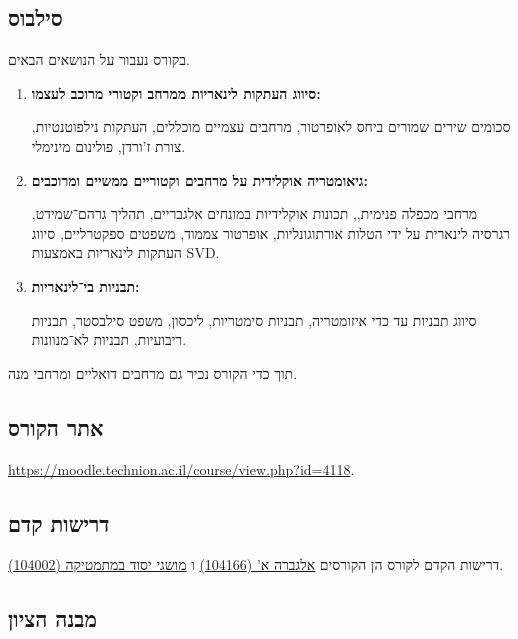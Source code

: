 \documentclass[a4paper,10pt,oneside,openany]{article}
\begin{document}
\subsection*{סילבוס}

בקורס נעבור על הנושאים הבאים.

\begin{enumerate}
\item \textbf {סיווג העתקות לינאריות ממרחב וקטורי מרוכב לעצמו:}

סכומים שירים שמורים ביחס לאופרטור, מרחבים עצמיים מוכללים, העתקות נילפוטנטיות, צורת ז'ורדן, פולינום מינימלי.

\item \textbf{גיאומטריה אוקלידית על מרחבים וקטוריים ממשיים ומרוכבים:}

מרחבי מכפלה פנימית,, תכונות אוקלידיות במונחים אלגבריים, תהליך גרהם־שמידט, רגרסיה לינארית על ידי הטלות אורתוגונליות, אופרטור צממוד, משפטים ספקטרליים, סיווג העתקות לינאריות באמצעות 
\textenglish{SVD}.

\item \textbf{תבניות בי־לינאריות:}

סיווג תבניות עד כדי איזומטריה, תבניות סימטריות, ליכסון, משפט סילבסטר, תבניות ריבועיות, תבניות לא‏־מנוונות.
\end{enumerate}

תוך כדי הקורס נכיר גם מרחבים דואליים ומרחבי מנה.

\subsection*{אתר הקורס}

\textenglish{\href{https://moodle.technion.ac.il/course/view.php?id=4118}{https://moodle.technion.ac.il/course/view.php?id=4118}}.

\subsection*{דרישות קדם}

דרישות הקדם לקורס הן הקורסים
\href{https://ug3.technion.ac.il/rishum/course/104166}{אלגברה א' (104166)}
ו%
\href{https://ug3.technion.ac.il/rishum/course/104002}{מושגי יסוד במתמטיקה (104002)}.

\subsection*{מבנה הציון}
\end{document}
